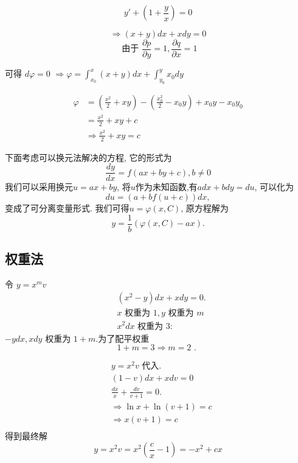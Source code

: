 \begin{example}
$$
y'+\left(1+\frac{y}{x}\right)=0
$$
\end{example}
\begin{solution}
$$
\Rightarrow(x+y) d x+x d y=0
$$
$$
\text { 由于 } \frac{\partial p}{\partial y}=1, \frac{\partial q}{\partial x}=1
$$

可得 $d \varphi=0$
$\Rightarrow \varphi=\int_{x_0}^x(x+y) d x+\int_{y_0}^y x_0 d y$

\begin{equation}
    \begin{aligned}
    \varphi & =\left(\frac{x^2}{2}+x y\right)-\left(\frac{x_0^2}{2}-x_0 y\right)+x_0 y-x_0 y_0 \\
    & =\frac{x^2}{2}+x y+c \\
    & \Rightarrow \frac{x^2}{2}+x y=c
    \end{aligned}
    \end{equation}
\end{solution}

下面考虑可以换元法解决的方程, 它的形式为
\begin{equation}
    \frac{dy}{dx} = f(a x + by + c), b\neq 0
\end{equation}
我们可以采用换元$u = ax + by$, 将$u$作为未知函数,有$a dx + b dy = du $,
可以化为
\begin{equation}
    du  = ( a + b f(u+c) ) dx,
\end{equation}
变成了可分离变量形式. 我们可得$u  = \varphi (x, C)$, 原方程解为
\begin{equation}
    y = \frac{1}{b} \left(\varphi(x, C) - a x \right).
\end{equation}

\subsection{权重法}
令 $y=x^{m}v$
$$
\begin{aligned}
& \left(x^2-y\right) d x+x d y=0 . \\
& x \text { 权重为 } 1, y\text { 权重为 }m \\
& x^2 d x \text { 权重为 } 3:
\end{aligned}
$$
$-ydx,  x d y$ 权重为 $1+m$.为了配平权重
$$
1+m=3 \Rightarrow m=2 \text { . }
$$


$$
\begin{aligned}
& y=x^2 v \text { 代入. } \\
& (1-v) d x+x d v=0 \\
& \frac{d x}{x}+\frac{d v}{v+1}=0 . \\
& \Rightarrow \ln x+\ln (v+1)=c \\
& \Rightarrow x(v+1)=c \\
\end{aligned}
$$
得到最终解
\[
    y=x^2 v=x^2\left(\frac{c}{x}-1\right) = -x^2+c x 
\]

